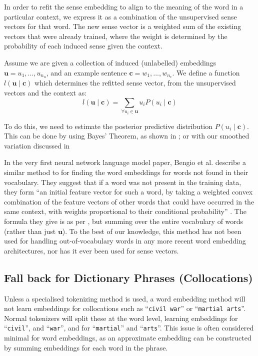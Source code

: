 \documentclass{article} %
\def\parencite{\cite} %
\renewcommand{\c}{\mathbf{c}}
\renewcommand{\u}{\mathbf{u}}
\newcommand{\wordquote}[1]{\enquote{\texttt{#1}}}
\begin{document}
In order to refit the sense embedding to align to the meaning of the word in a particular context, we express it as a combination of the unsupervised sense vectors for that word.
The new sense vector is a weighted sum of the existing vectors that were already trained, where the weight is determined by the probability of each induced sense given the context.


Assume we are given a collection of induced (unlabelled) embeddings $\u={u_1,...,u_{n_u}}$, and an example sentence $\c={w_1,...,w_{n_c}}$. We define a function $l(\u \mid \c )$ which determines the refitted sense vector, from the unsupervised vectors and the context as:
\begin{equation} \label{eq:synth}
l(\u \mid \c ) = \sum_{\forall u_i \in \u} u_i P(u_i \mid \c)
\end{equation}

To do this, we need to estimate the posterior predictive distribution $P(u_i \mid \c)$.
This can be done by using Bayes' Theorem, as shown in ; or with our smoothed variation discussed in 


In the very first neural network language model paper, Bengio et al. \parencite{NPLM} describe a similar method to  for finding the word embeddings for words not found in their vocabulary. They suggest that if a word was not present in the training data, they form \enquote{an initial feature vector for such a word, by taking a weighted convex combination of the feature vectors of other words that could have occurred in the same context, with weights proportional to their conditional probability} \parencite{NPLM}. The formula they give is as per , but summing over the entire vocabulary of words (rather than just $\u$). To the best of our knowledge, this method has not been used for handling out-of-vocabulary words in any more recent word embedding architectures, nor has it ever been used for sense vectors.


\subsection {Fall back for Dictionary Phrases (Collocations)}
Unless a specialised tokenizing method is used, a word embedding method will not learn embeddings for collocations such as \wordquote{civil war} or \wordquote{martial arts}. Normal tokenizers will split these at the word level, learning embeddings for \wordquote{civil}, and \wordquote{war}, and for \wordquote{martial} and \wordquote{arts}. This issue is often considered minimal for word embeddings, as an approximate embedding can be constructed by summing embeddings for each word in the phrase.
\end{document}
